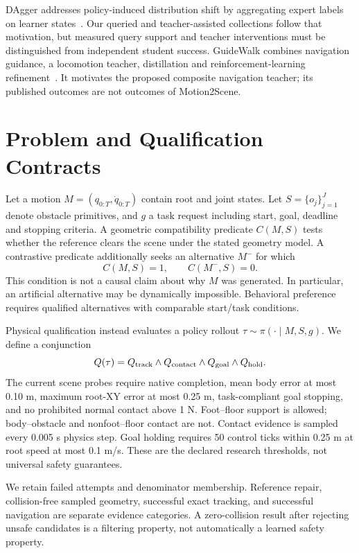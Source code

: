 \documentclass[10pt,twocolumn]{article}
\begin{document}
DAgger addresses policy-induced distribution shift by aggregating expert labels on learner states~\cite{dagger}. Our queried and teacher-assisted collections follow that motivation, but measured query support and teacher interventions must be distinguished from independent student success. GuideWalk combines navigation guidance, a locomotion teacher, distillation and reinforcement-learning refinement~\cite{guidewalk}. It motivates the proposed composite navigation teacher; its published outcomes are not outcomes of Motion2Scene.

\section{Problem and Qualification Contracts}
Let a motion $M=(q_{0:T},\dot q_{0:T})$ contain root and joint states. Let $S=\{o_j\}_{j=1}^{J}$ denote obstacle primitives, and $g$ a task request including start, goal, deadline and stopping criteria. A geometric compatibility predicate $C(M,S)$ tests whether the reference clears the scene under the stated geometry model. A contrastive predicate additionally seeks an alternative $M^-$ for which
\begin{equation}
 C(M,S)=1,\qquad C(M^-,S)=0.
\end{equation}
This condition is not a causal claim about why $M$ was generated. In particular, an artificial alternative may be dynamically impossible. Behavioral preference requires qualified alternatives with comparable start/task conditions.

Physical qualification instead evaluates a policy rollout $\tau\sim\pi(\cdot\mid M,S,g)$. We define a conjunction
\begin{equation}
 Q(\tau)=Q_{\rm track}\land Q_{\rm contact}\land Q_{\rm goal}\land Q_{\rm hold}.
\end{equation}
The current scene probes require native completion, mean body error at most 0.10 m, maximum root-XY error at most 0.25 m, task-compliant goal stopping, and no prohibited normal contact above 1 N. Foot--floor support is allowed; body--obstacle and nonfoot--floor contact are not. Contact evidence is sampled every 0.005 s physics step. Goal holding requires 50 control ticks within 0.25 m at root speed at most 0.1 m/s. These are the declared research thresholds, not universal safety guarantees.

We retain failed attempts and denominator membership. Reference repair, collision-free sampled geometry, successful exact tracking, and successful navigation are separate evidence categories. A zero-collision result after rejecting unsafe candidates is a filtering property, not automatically a learned safety property.
\end{document}
